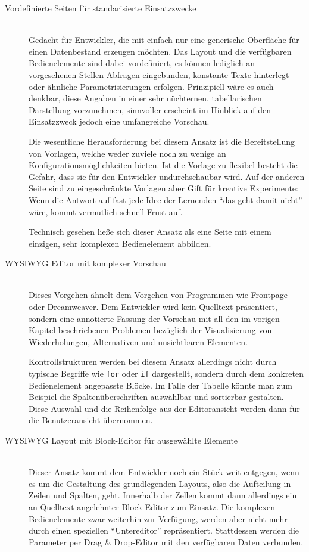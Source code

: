 \begin{description}
\item[ Vordefinierte Seiten für standarisierte Einsatzzwecke] \hfill \\
  Gedacht für Entwickler, die mit \idename{} einfach nur eine generische Oberfläche für einen Datenbestand erzeugen möchten. Das Layout und die verfügbaren Bedienelemente sind dabei vordefiniert, es können lediglich an vorgesehenen Stellen Abfragen eingebunden, konstante Texte hinterlegt oder ähnliche Parametrisierungen erfolgen. Prinzipiell wäre es auch denkbar, diese Angaben in einer sehr nüchternen, tabellarischen Darstellung vorzunehmen, sinnvoller erscheint im Hinblick auf den Einsatzzweck jedoch eine umfangreiche Vorschau.

  Die wesentliche Herausforderung bei diesem Ansatz ist die Bereitstellung von Vorlagen, welche weder zuviele noch zu wenige an Konfigurationsmöglichkeiten bieten. Ist die Vorlage zu flexibel besteht die Gefahr, dass sie für den Entwickler undurchschaubar wird. Auf der anderen Seite sind zu eingeschränkte Vorlagen aber Gift für kreative Experimente: Wenn die Antwort auf fast jede Idee der Lernenden "`das geht damit nicht"' wäre, kommt vermutlich schnell Frust auf.

  Technisch gesehen ließe sich dieser Ansatz als eine Seite mit einem einzigen, sehr komplexen Bedienelement abbilden.

\item[ WYSIWYG Editor mit komplexer Vorschau] \hfill \\
  Dieses Vorgehen ähnelt dem Vorgehen von Programmen wie Frontpage oder Dreamweaver. Dem Entwickler wird kein Quelltext präsentiert, sondern eine annotierte Fassung der Vorschau mit all den im vorigen Kapitel beschriebenen Problemen bezüglich der Visualisierung von Wiederholungen, Alternativen und unsichtbaren Elementen.

  Kontrollstrukturen werden bei diesem Ansatz allerdings nicht durch typische Begriffe wie \texttt{for} oder \texttt{if} dargestellt, sondern durch dem konkreten Bedienelement angepasste Blöcke. Im Falle der Tabelle könnte man zum Beispiel die Spaltenüberschriften auswählbar und sortierbar gestalten. Diese Auswahl und die Reihenfolge aus der Editoransicht werden dann für die Benutzeransicht übernommen.
\item[ WYSIWYG Layout mit Block-Editor für ausgewählte Elemente] \hfill \\
  Dieser Ansatz kommt dem Entwickler noch ein Stück weit entgegen, wenn es um die Gestaltung des grundlegenden Layouts, also die Aufteilung in Zeilen und Spalten, geht. Innerhalb der Zellen kommt dann allerdings ein an Quelltext angelehnter Block-Editor zum Einsatz. Die komplexen Bedienelemente zwar weiterhin zur Verfügung, werden aber nicht mehr durch einen speziellen "`Untereditor"' repräsentiert. Stattdessen werden die Parameter per Drag \& Drop-Editor mit den verfügbaren Daten verbunden.
  

\end{description}
